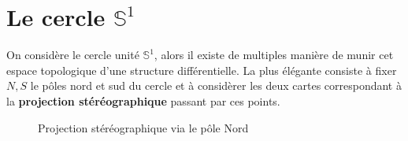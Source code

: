    \section{Le cercle \( \mathbb{S}^1 \)}
   On considère le cercle unité \( \mathbb{S}^1 \), alors il existe de multiples manière de munir cet espace topologique d'une structure différentielle. La plus élégante consiste à fixer \( N, S \) le pôles nord et sud du cercle et à considèrer les deux cartes correspondant à la \textbf{projection stéréographique} passant par ces points.
   \begin{figure*}[h]
      \centering
      \caption{Projection stéréographique via le pôle Nord}
   \end{figure*}

